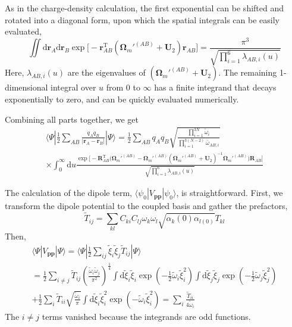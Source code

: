 As in the charge-density calculation, the first exponential can be shifted and rotated into a diagonal form, upon which the spatial integrals can be easily evaluated,
\begin{equation}
\iint\mathrm d\mathbf r_A\mathrm d\mathbf r_B\exp\big[-\mathbf r_{AB}^\mathrm T(\boldsymbol\Omega_m'^{(AB)}+\mathbf U_2)\mathbf r_{AB}\big]=\frac{\pi^3}{\sqrt{\prod_{i=1}^6\lambda_{AB,i}(u)}}
\end{equation}
Here, $\lambda_{AB,i}(u)$ are the eigenvalues of $(\boldsymbol\Omega_m'^{(AB)}+\mathbf U_2)$. The remaining 1-dimensional integral over $u$ from 0 to $\infty$ has a finite integrand that decays exponentially to zero, and can be quickly evaluated numerically.

Combining all parts together, we get
\begin{multline}
\langle\Psi|\tfrac12\sum_{AB}\frac{q_A q_B}{\lvert\mathbf r_A-\mathbf r_B\rvert}|\Psi\rangle
=\frac12\sum_{AB}q_A q_B\sqrt{\frac{\prod_{i=1}^{3N}\tilde\omega_i}{\prod_{i=1}^{3(N-2)}\bar\omega_{AB,i}}} \\
\times\int_0^\infty\mathrm du\frac{\exp\big[-\mathbf R_{AB}^\mathrm T\big(\boldsymbol\Omega_m'^{(AB)}-\boldsymbol\Omega_m'^{(AB)}(\boldsymbol\Omega_m'^{(AB)}+\mathbf U_2)^{-1}\boldsymbol\Omega_m'^{(AB)}\big)\mathbf R_{AB}\big]}{\sqrt{\prod_{i=1}^6\lambda_{AB,i}(u)}}
\label{eq:coulombrr}
\end{multline}

The calculation of the dipole term, $\langle\psi_0|V_\mathbf{pp}|\psi_0\rangle$, is straightforward.
First, we transform the dipole potential to the coupled basis and gather the prefactors,
\begin{equation}
  \tilde T_{ij}=\sum_{kl}C_{ki}C_{lj}\omega_k\omega_l\sqrt{\alpha_{k}(0)\alpha_{l(0)}}T_{kl}
\end{equation}
Then,
\begin{multline}
\langle\Psi|V_\mathbf{pp}|\Psi\rangle=\langle\Psi|\tfrac12\sum_{ij}\tilde\xi_i\tilde\xi_j\tilde T_{ij}|\Psi\rangle \\
=\frac12\sum_{i\neq j}\tilde T_{ij}\left(\frac{\tilde\omega_i\tilde\omega_j}{\pi^2}\right)^\frac14\int\mathrm d\tilde\xi_i\tilde\xi_i\exp\left(-\frac12\tilde\omega_i\tilde\xi_i^2\right)\int\mathrm d\tilde\xi_j\tilde\xi_j\exp\left(-\frac12\tilde\omega_j\tilde\xi_j^2\right) \\
+\frac12\sum_{i}\tilde T_{ii}\sqrt{\frac{\tilde\omega_i}{\pi}}\int\mathrm d\tilde\xi_i\tilde\xi_i^2\exp\left(-\tilde\omega_i\tilde\xi_i^2\right)=\sum_i\frac{\tilde T_{ii}}{4\tilde\omega_i}
\label{eq:dipoleterm}
\end{multline}
The $i\neq j$ terms vanished because the integrands are odd functions.

